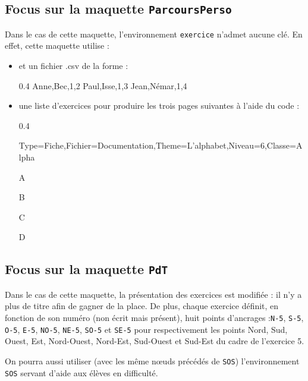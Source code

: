 \documentclass[12pt,french]{article}
\begin{document}
\subsection*{Focus sur la maquette \lstinline!ParcoursPerso!}
Dans le cas de cette maquette, l'environnement \lstinline!exercice! n'admet aucune clé. En effet, cette maquette utilise :
\begin{itemize}
\item et un fichier {\ttfamily *.csv} de la forme :
  \begin{Codes}{0.4}{}
Anne,Bec,{1,2}
Paul,Isse,{1,3}
Jean,Némar,{1,4}
  \end{Codes}
\item une liste d'exercices pour produire les trois pages suivantes à l'aide du code :
\begin{Codes}{0.4}{}
\begin{Maquette}[ParcoursPerso]{Type=Fiche,Fichier=Documentation,Theme=L'alphabet,Niveau=6,Classe=Alpha}
  \begin{exercice}
    A
  \end{exercice}
  \begin{exercice}
    B
  \end{exercice}
  \begin{exercice}
    C
  \end{exercice}
  \begin{exercice}
    D
  \end{exercice}
\end{Maquette}
\end{Codes}
\end{itemize}
\clearpage

\clearpage
\subsection*{Focus sur la maquette \lstinline!PdT!}
Dans le cas de cette maquette, la présentation des exercices est modifiée : il n'y a plus de titre afin de gagner de la place. De plus, chaque exercice définit, en fonction de son numéro (non écrit mais présent), huit points d'ancrages :\lstinline!N-5!, \lstinline!S-5!, \lstinline!O-5!, \lstinline!E-5!, \lstinline!NO-5!, \lstinline!NE-5!, \lstinline!SO-5! et \lstinline!SE-5! pour respectivement les points Nord, Sud, Ouest, Est, Nord-Ouest, Nord-Est, Sud-Ouest et Sud-Est du cadre de l'exercice 5.

On pourra aussi utiliser (avec les même n\oe uds précédés de \lstinline!SOS!) l'environnement \lstinline!SOS! servant d'aide aux élèves en difficulté.
\end{document}
